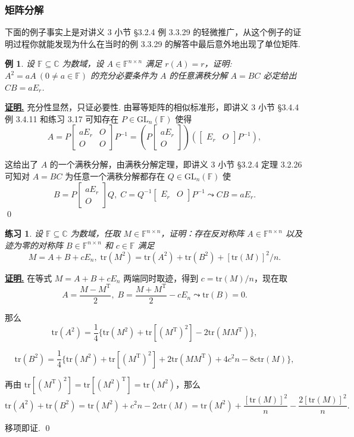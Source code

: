 \documentclass[10pt,openany]{article}
\theoremstyle{thmstyle} %
\newtheorem{practice}{练习}[section]
\theoremstyle{defstyle} %
\theoremstyle{prostyle} %
\theoremstyle{exastyle}
\newtheorem{example}[theorem]{例}
\theoremstyle{remstyle}
\renewenvironment{proof}[1][证明]{\par\underline{\textbf{#1.}} \;\fangsong}{\qed\par}
\newcommand{\T}{^{\text{T}}}
\newcommand{\F}{\mathbb{F}}
\newcommand{\gfn}{\text{GL}_n(\mathbb{F})}
\newcommand{\C}{\mathbb{C}}
\newcommand{\n}{^{n \times n}}
\newcommand{\tr}{\mathrm{tr}}
\begin{document}
\subsubsection{矩阵分解}

下面的例子事实上是对讲义 3 小节 \S 3.2.4  例 3.3.29 的轻微推广，从这个例子的证明过程你就能发现为什么在当时的例 3.3.29 的解答中最后意外地出现了单位矩阵.

\begin{example}
	设 \( \F \subseteq \C \) 为数域，设 \( A \in \F\n \) 满足 \( r(A)=r \)，证明: \( A^2=aA \ (0 \neq a \in \F) \) 的充分必要条件为 \( A \) 的任意满秩分解 \( A=BC \) 必定给出 \( CB=aE_r \).
\end{example}

\begin{proof}
   充分性显然，只证必要性. 由幂等矩阵的相似标准形，即讲义 3 小节 \S 3.4.4  例 3.4.11 和练习 3.17 可知存在 \( P \in \gfn \) 使得
   \[ A=P\begin{bmatrix}
   	aE_r & O \\
   	O & O
   \end{bmatrix}P^{-1}= \left( P \begin{bmatrix}
   aE_r \\ O
   \end{bmatrix}\right) \left( \begin{bmatrix}
   E_r & O
   \end{bmatrix}P^{-1} \right), \]
   
   这给出了 \( A \) 的一个满秩分解，由满秩分解定理，即讲义 3 小节 \S 3.2.4 定理 3.2.26 可知对 \( A=BC \) 为任意一个满秩分解都存在 \( Q \in \gfn \) 使
   \[ B=P \begin{bmatrix}
   	aE_r \\ O
   \end{bmatrix} Q, \; C=Q^{-1} \begin{bmatrix}
   E_r & O
   \end{bmatrix}P^{-1} \leadsto CB=aE_r. \]
\end{proof}

\begin{practice}
	设 \( \F \subseteq \C \) 为数域，任取 \( M \in \F\n \)，证明：存在反对称阵 \( A \in \F\n \) 以及迹为零的对称阵 \( B \in \F\n \) 和 \( c \in \F \) 满足
	\[ M=A+B+cE_n, \; \tr(M^2)=\tr(A^2)+\tr(B^2)+[\tr(M)]^2/n. \]
\end{practice}

\begin{proof}
	在等式 \( M=A+B+cE_n \) 两端同时取迹，得到 \( c=\tr(M)/n \)，现在取
	\[ A=\frac{M-M\T}{2}, \; B=\frac{M+M\T}{2}-cE_n \leadsto \tr(B)=0. \]
	
	那么 
	\[ \tr(A^2)= \frac{1}{4} \{ \tr(M^2)+\tr[(M\T)^2]-2\tr(MM\T) \}, \]
	
	\[ \tr(B^2)= \frac{1}{4} \{ \tr(M^2)+\tr[(M\T)^2]+2\tr(MM\T)+4c^2n-8c\tr(M) \}, \]
	
	再由 \( \tr[(M\T)^2]=\tr[(M^2)\T]=\tr(M^2) \)，那么
	\[ \tr(A^2)+\tr(B^2)= \tr(M^2)+c^2n-2c\tr(M)= \tr(M^2)+ \frac{[\tr(M)]^2}{n}-\frac{2[\tr(M)]^2}{n}. \]
	
	移项即证.
\end{proof}
\end{document}
